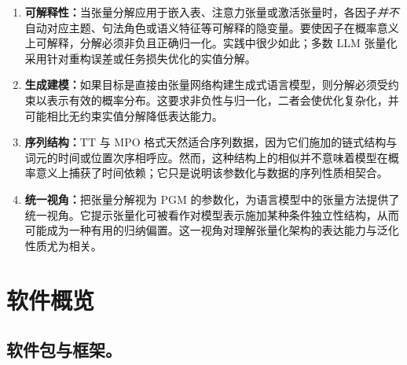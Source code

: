 \documentclass[11pt]{article}
\begin{document}
\begin{enumerate}
\item \textbf{可解释性：}当张量分解应用于嵌入表、注意力张量或激活张量时，各因子\emph{并不}自动对应主题、句法角色或语义特征等可解释的隐变量。要使因子在概率意义上可解释，分解必须非负且正确归一化。实践中很少如此；多数 LLM 张量化采用针对重构误差或任务损失优化的实值分解。

\item \textbf{生成建模：}如果目标是直接由张量网络构建生成式语言模型，则分解必须受约束以表示有效的概率分布。这要求非负性与归一化，二者会使优化复杂化，并可能相比无约束实值分解降低表达能力。

\item \textbf{序列结构：}TT 与 MPO 格式天然适合序列数据，因为它们施加的链式结构与词元的时间或位置次序相呼应。然而，这种结构上的相似并不意味着模型在概率意义上捕获了时间依赖；它只是说明该参数化与数据的序列性质相契合。

\item \textbf{统一视角：}把张量分解视为 PGM 的参数化，为语言模型中的张量方法提供了统一视角。它提示张量化可被看作对模型表示施加某种条件独立性结构，从而可能成为一种有用的归纳偏置。这一视角对理解张量化架构的表达能力与泛化性质尤为相关。
\end{enumerate}


\section{软件概览}
\label{sec:software-overview}


\subsection{软件包与框架。}
\end{document}

